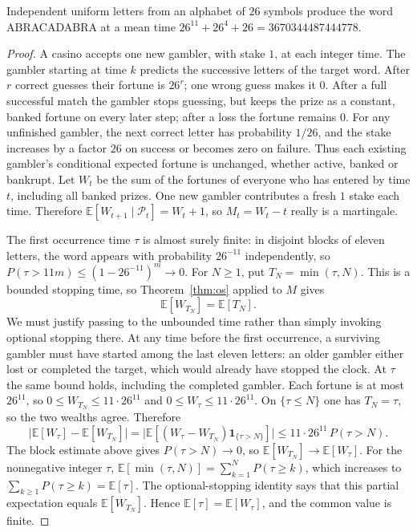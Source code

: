 \begin{theorem}\label{thm:monkey}
Independent uniform letters from an alphabet of $26$ symbols produce the word ABRACADABRA at a mean time $26^{11}+26^4+26=3670344487444778$.
\end{theorem}
\begin{proof}
A casino accepts one new gambler, with stake $1$, at each integer time. The gambler starting at time $k$ predicts the successive letters of the target word. After $r$ correct guesses their fortune is $26^r$; one wrong guess makes it $0$. After a full successful match the gambler stops guessing, but keeps the prize as a constant, banked fortune on every later step; after a loss the fortune remains $0$. For any unfinished gambler, the next correct letter has probability $1/26$, and the stake increases by a factor $26$ on success or becomes zero on failure. Thus each existing gambler's conditional expected fortune is unchanged, whether active, banked or bankrupt. Let $W_t$ be the sum of the fortunes of everyone who has entered by time $t$, including all banked prizes. One new gambler contributes a fresh $1$ stake each time. Therefore $\mathbb E[W_{t+1}\mid\mathcal P_t]=W_t+1$, so $M_t=W_t-t$ really is a martingale.

The first occurrence time $\tau$ is almost surely finite: in disjoint blocks of eleven letters, the word appears with probability $26^{-11}$ independently, so $P(\tau>11m)\le(1-26^{-11})^m\to0$. For $N\ge1$, put $T_N=\min(\tau,N)$. This is a bounded stopping time, so Theorem~\ref{thm:os} applied to $M$ gives
\[
 \mathbb E[W_{T_N}]=\mathbb E[T_N].
\]
We must justify passing to the unbounded time rather than simply invoking optional stopping there. At any time before the first occurrence, a surviving gambler must have started among the last eleven letters: an older gambler either lost or completed the target, which would already have stopped the clock. At $\tau$ the same bound holds, including the completed gambler. Each fortune is at most $26^{11}$, so $0\le W_{T_N}\le 11\cdot26^{11}$ and $0\le W_\tau\le 11\cdot26^{11}$. On $\{\tau\le N\}$ one has $T_N=\tau$, so the two wealths agree. Therefore
\[
 \bigl|\mathbb E[W_\tau]-\mathbb E[W_{T_N}]\bigr|
 =\bigl|\mathbb E[(W_\tau-W_{T_N})\mathbf 1_{\{\tau>N\}}]\bigr|
 \le 11\cdot26^{11}\,P(\tau>N).
\]
The block estimate above gives $P(\tau>N)\to0$, so $\mathbb E[W_{T_N}]\to\mathbb E[W_\tau]$. For the nonnegative integer $\tau$, $\mathbb E[\min(\tau,N)]=\sum_{k=1}^N P(\tau\ge k)$, which increases to $\sum_{k\ge1}P(\tau\ge k)=\mathbb E[\tau]$. The optional-stopping identity says that this partial expectation equals $\mathbb E[W_{T_N}]$. Hence $\mathbb E[\tau]=\mathbb E[W_\tau]$, and the common value is finite.


\end{proof}
